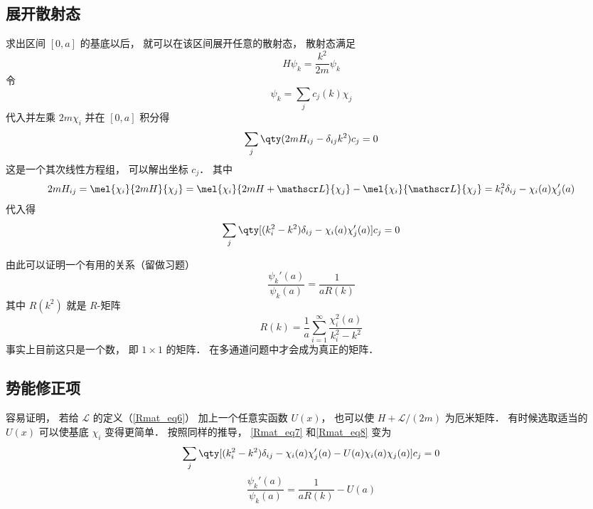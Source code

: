 \subsection{展开散射态}
求出区间 $[0,a]$ 的基底以后， 就可以在该区间展开任意的散射态， 散射态满足
\begin{equation}\label{Rmat_eq4}
H\psi_k = \frac{k^2}{2m}\psi_k
\end{equation}
令
\begin{equation}\label{Rmat_eq5}
\psi_k = \sum_j c_j(k)\chi_j
\end{equation}
代入并左乘 $2m\chi_i$ 并在 $[0,a]$ 积分得
\begin{equation}
\sum_j \qty(2mH_{ij} - \delta_{ij}k^2) c_j = 0
\end{equation}
这是一个其次线性方程组， 可以解出坐标 $c_j$． 其中
\begin{equation}
2mH_{ij} = \mel{\chi_i}{2mH}{\chi_j} = \mel{\chi_i}{2mH + \mathscr L}{\chi_j} - \mel{\chi_i}{\mathscr L}{\chi_j} 
= k_i^2\delta_{ij} - \chi_i(a)\chi'_j(a)
\end{equation}
代入得
\begin{equation}\label{Rmat_eq7}
\sum_j \qty[(k_i^2 - k^2)\delta_{ij} - \chi_i(a)\chi'_j(a)] c_j = 0
\end{equation}

由此可以证明一个有用的关系（留做习题）
\begin{equation}\label{Rmat_eq8}
\frac{\psi_k'(a)}{\psi_k(a)} = \frac{1}{aR(k)}
\end{equation}
其中 $R(k^2)$ 就是 $R$-矩阵
\begin{equation}
R(k) = \frac{1}{a} \sum_{i=1}^\infty \frac{\chi_i^2(a)}{k_i^2 - k^2}
\end{equation}
事实上目前这只是一个数， 即 $1\times 1$ 的矩阵． 在多通道问题中才会成为真正的矩阵．

\subsection{势能修正项}
容易证明， 若给 $\mathscr L$ 的定义（\autoref{Rmat_eq6}） 加上一个任意实函数 $U(x)$， 也可以使 $H+\mathscr L/(2m)$ 为厄米矩阵． 有时候选取适当的 $U(x)$ 可以使基底 $\chi_i$ 变得更简单． 按照同样的推导， \autoref{Rmat_eq7} 和\autoref{Rmat_eq8} 变为
\begin{equation}
\sum_j \qty[(k_i^2 - k^2)\delta_{ij} - \chi_i(a)\chi'_j(a) - U(a)\chi_i(a)\chi_j(a)] c_j = 0
\end{equation}
\begin{equation}
\frac{\psi_k'(a)}{\psi_k(a)} = \frac{1}{aR(k)} - U(a)
\end{equation}
